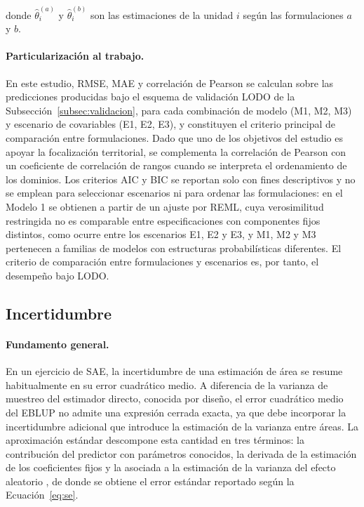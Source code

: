 \noindent donde $\hat{\theta}_i^{(a)}$ y $\hat{\theta}_i^{(b)}$ son las estimaciones de la unidad $i$ según las formulaciones $a$ y $b$.

\paragraph{Particularización al trabajo.}
En este estudio, RMSE, MAE y correlación de Pearson se calculan sobre las predicciones producidas bajo el esquema de validación LODO de la Subsección~\ref{subsec:validacion}, para cada combinación de modelo (M1, M2, M3) y escenario de covariables (E1, E2, E3), y constituyen el criterio principal de comparación entre formulaciones. Dado que uno de los objetivos del estudio es apoyar la focalización territorial, se complementa la correlación de Pearson con un coeficiente de correlación de rangos cuando se interpreta el ordenamiento de los dominios. Los criterios AIC y BIC se reportan solo con fines descriptivos y no se emplean para seleccionar escenarios ni para ordenar las formulaciones: en el Modelo 1 se obtienen a partir de un ajuste por REML, cuya verosimilitud restringida no es comparable entre especificaciones con componentes fijos distintos, como ocurre entre los escenarios E1, E2 y E3, y M1, M2 y M3 pertenecen a familias de modelos con estructuras probabilísticas diferentes. El criterio de comparación entre formulaciones y escenarios es, por tanto, el desempeño bajo LODO.

\subsection{Incertidumbre}
\label{subsec:incertidumbre}

\paragraph{Fundamento general.}
En un ejercicio de SAE, la incertidumbre de una estimación de área se resume habitualmente en su error cuadrático medio. A diferencia de la varianza de muestreo del estimador directo, conocida por diseño, el error cuadrático medio del EBLUP no admite una expresión cerrada exacta, ya que debe incorporar la incertidumbre adicional que introduce la estimación de la varianza entre áreas. La aproximación estándar descompone esta cantidad en tres términos: la contribución del predictor con parámetros conocidos, la derivada de la estimación de los coeficientes fijos y la asociada a la estimación de la varianza del efecto aleatorio \cite{PrasadRao_1990}, de donde se obtiene el error estándar reportado según la Ecuación~\ref{eq:se}.

